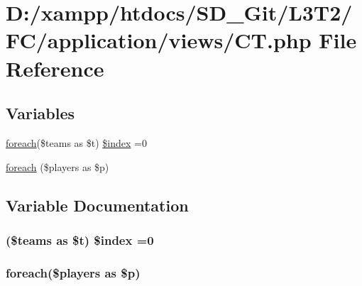 \hypertarget{_c_t_8php}{}\section{D\+:/xampp/htdocs/\+S\+D\+\_\+\+Git/\+L3\+T2/\+F\+C/application/views/\+C\+T.php File Reference}
\label{_c_t_8php}
\subsection*{Variables}
\begin{DoxyCompactItemize}
\item 
\hyperlink{view__points_8php_a7ad0caecb10918b48851bd7908ec97c5}{foreach}(\$teams as \$t) \hyperlink{_c_t_8php_ac06ba3614f63a5b49247b1f997e6d20e}{\$index} =0
\item 
\hyperlink{_c_t_8php_adeedc747f289831747aab8fb71df7bd3}{foreach} (\$players as \$p)
\end{DoxyCompactItemize}


\subsection{Variable Documentation}
\hypertarget{_c_t_8php_ac06ba3614f63a5b49247b1f997e6d20e}{}
\subsubsection[{\$index}]{ (\$teams as \$t) \$index =0}\label{_c_t_8php_ac06ba3614f63a5b49247b1f997e6d20e}
\hypertarget{_c_t_8php_adeedc747f289831747aab8fb71df7bd3}{}
\subsubsection[{foreach}]{\setlength{\rightskip}{0pt plus 5cm}foreach(\$players as \$p)}\label{_c_t_8php_adeedc747f289831747aab8fb71df7bd3}
